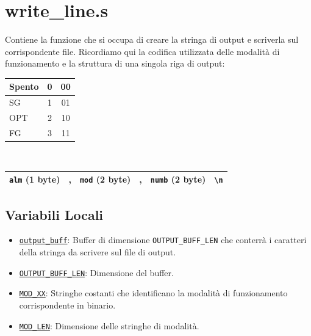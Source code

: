 \documentclass[a4paper,11pt]{article}
\newcommand{\itemtt}[1]{\item \texttt{#1}}
\begin{document}
	\section{write\_line.s}
	Contiene la funzione che si occupa di creare la stringa di output e scriverla sul corrispondente file. 
	Ricordiamo qui la codifica utilizzata delle modalità di funzionamento e la struttura di una singola riga di output:
	\begin{table}[!h]
		\centering
		\begin{tabular}{| l | c | c |}
			\hline
			Spento & 0 & 00 \\ \hline
			SG & 1 & 01 \\ \hline
			OPT & 2 & 10 \\ \hline
			FG & 3 & 11 \\ \hline
		\end{tabular}
		\\
		\vspace{5mm}
		\begin{tabular}{| c | c | c | c | c | c |}
			\hline
			\texttt{alm} (1 byte) & , & \texttt{mod} (2 byte) & , & \texttt{numb} (2 byte) &  \texttt{\textbackslash n} \\ \hline
		\end{tabular}
	\end{table}
	\subsection{Variabili Locali}
	\begin{itemize}
		\itemtt{\hyperref[v:6:1]{output\_buff}}: Buffer di dimensione \texttt{OUTPUT\_BUFF\_LEN} che conterrà i caratteri della stringa da scrivere sul file di output.
		\itemtt{\hyperref[v:6:2]{OUTPUT\_BUFF\_LEN}}: Dimensione del buffer.
		\itemtt{\hyperref[v:6:3]{MOD\_XX}}: Stringhe costanti che identificano la modalità di funzionamento corrispondente in binario.
		\itemtt{\hyperref[v:6:4]{MOD\_LEN}}: Dimensione delle stringhe di modalità.
	\end{itemize}
	
\end{document}
